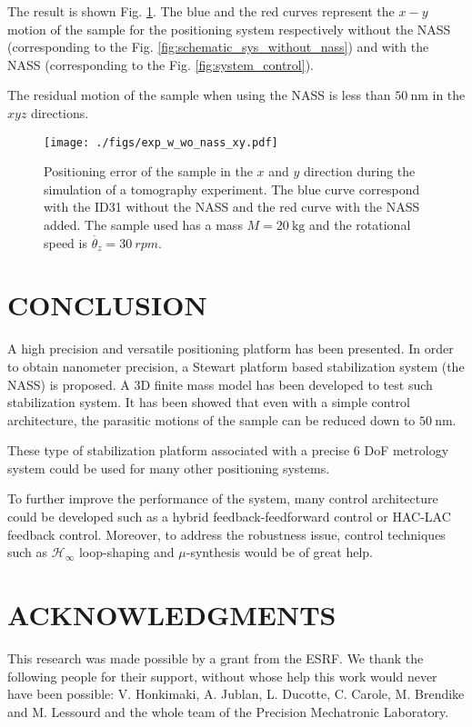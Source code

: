 \documentclass[a4paper, keeplastbox, biblatex]{jacow}
\begin{document}
The result is shown Fig. \ref{fig:exp_w_wo_nass_xy}. The blue and the red curves represent the \(x-y\) motion of the sample for the positioning system respectively without the NASS (corresponding to the Fig. \ref{fig:schematic_sys_without_nass}) and with the NASS (corresponding to the Fig. \ref{fig:system_control}).

The residual motion of the sample when using the NASS is less than \(\SI{50}{\nano\metre}\) in the \(xyz\) directions.

\begin{figure}[htbp]
\centering
\texttt{[image: ./figs/exp\_w\_wo\_nass\_xy.pdf]}
\caption{\label{fig:exp_w_wo_nass_xy}
Positioning error of the sample in the \(x\) and \(y\) direction during the simulation of a tomography experiment. The blue curve correspond with the ID31 without the NASS and the red curve with the NASS added. The sample used has a mass \(M=\SI{20}{\kilo\gram}\) and the rotational speed is \(\dot{\theta_z} = \SI{30}{rpm}\).}
\end{figure}

\section{CONCLUSION}
\label{sec:org99d6087}
A high precision and versatile positioning platform has been presented.
In order to obtain nanometer precision, a Stewart platform based stabilization system (the NASS) is proposed.
A 3D finite mass model has been developed to test such stabilization system. It has been showed that even with a simple control architecture, the parasitic motions of the sample can be reduced down to \(\SI{50}{\nano\metre}\).

These type of stabilization platform associated with a precise 6 DoF metrology system could be used for many other positioning systems.

To further improve the performance of the system, many control architecture could be developed such as a hybrid feedback-feedforward control or HAC-LAC feedback control. Moreover, to address the robustness issue, control techniques such as \(\mathcal{H}_\infty\) loop-shaping and \(\mu\)-synthesis would be of great help.

\section{ACKNOWLEDGMENTS}
\label{sec:orgb52f978}
This research was made possible by a grant from the ESRF.
We thank the following people for their support, without whose help this work would never have been possible: V. Honkimaki, A. Jublan, L. Ducotte, C. Carole, M. Brendike and M. Lessourd and the whole team of the Precision Mechatronic Laboratory.

\printbibliography
\end{document}
